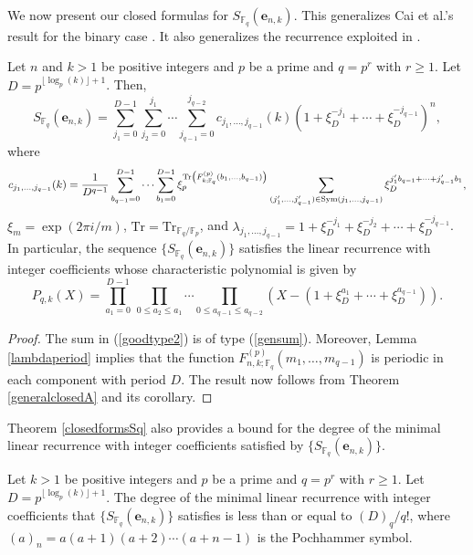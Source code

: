 We now present our closed formulas for $S_{\mathbb{F}_q}(\boldsymbol{e}_{n,k})$.  This generalizes Cai et al.'s result for the binary case \cite{cai}.  It also generalizes the recurrence exploited in \cite{cm1,cm2}.
\begin{theorem}
\label{closedformsSq}
 Let $n$ and $k>1$ be positive integers and $p$ be a prime and $q=p^r$ with $r\geq 1$.  Let $D=p^{\lfloor\log_p(k)\rfloor+1}$. Then,
 $$ S_{\mathbb{F}_q}(\boldsymbol{e}_{n,k}) = \sum_{j_1=0}^{D-1}\sum_{j_2=0}^{j_1}\cdots \sum_{j_{q-1}=0}^{j_{q-2}} 
 c_{j_1,\ldots,j_{q-1}}(k)\left(1+\xi_D^{-j_1}+\cdots+\xi_D^{-j_{q-1}}\right)^n,$$%
 where 
 \begin{equation*}
  c_{j_1,\ldots,j_{q-1}}(k)=\frac{1}{D^{q-1}}\sum_{b_{q-1}=0}^{D-1}\cdots \sum_{b_1=0}^{D-1} \xi_p^{\text{Tr}\left(F_{k;\mathbb{F}_q}^{(p)}\left(b_1,\ldots,b_{q-1}\right)\right)}
  \sum_{(j_1',\ldots,j_{q-1}')\in \mathrm{Sym}(j_1,\ldots, j_{q-1})}
 \xi_D^{j_1'b_{q-1}+\cdots+j_{q-1}' b_1},
 \end{equation*}
$\xi_{m}=\exp(2\pi i/m)$, $\text{Tr}=\text{Tr}_{\mathbb{F}_q/\mathbb{F}_p}$, and $\lambda_{j_1,\ldots, j_{q-1}} = 1+\xi_D^{-j_1}+\xi_{D}^{-j_2}+\cdots+\xi_D^{-j_{q-1}}$.
In particular, the sequence $\{S_{\mathbb{F}_q}(\boldsymbol{e}_{n,k})\}$ satisfies the linear recurrence with integer coefficients whose characteristic polynomial is given by
$$P_{q,k}(X)=\prod_{a_1=0}^{D-1}\,\prod_{0\leq a_2\leq a_1} \cdots \prod_{0\leq a_{q-1}\leq a_{q-2}} \left(X-\left(1+\xi_D^{a_1}+\cdots+\xi_D^{a_{q-1}}\right)\right).$$
\end{theorem}

\begin{proof}
The sum in (\ref{goodtype2}) is of type (\ref{gensum}).  Moreover, Lemma \ref{lambdaperiod} implies that the function $F^{(p)}_{n,k;\mathbb{F}_q}(m_1,\ldots,m_{q-1})$ is periodic in each component with period $D$.  
The result now follows from Theorem \ref{generalclosedA} and its corollary.
\end{proof}

Theorem \ref{closedformsSq} also provides a bound for the degree of the minimal linear recurrence with integer coefficients satisfied by $\{S_{\mathbb{F}_q}(\boldsymbol{e}_{n,k})\}$.

\begin{corollary}
 Let $k>1$ be positive integers and $p$ be a prime and $q=p^r$ with $r\geq 1$.  Let $D=p^{\lfloor\log_p(k)\rfloor+1}$. 
 The degree of the minimal linear recurrence with integer coefficients that $\{S_{\mathbb{F}_q}(\boldsymbol{e}_{n,k})\}$ satisfies is less than or equal to $(D)_q/q!$, where 
 $(a)_n = a(a+1)(a+2)\cdots(a+n-1)$ is the Pochhammer symbol.
\end{corollary}

